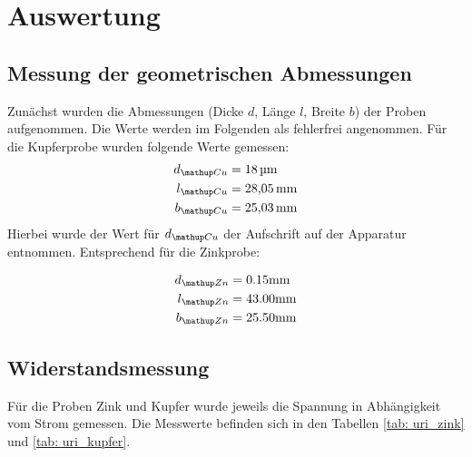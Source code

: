 \newpage

\section{Auswertung}

\subsection{Messung der geometrischen Abmessungen}
Zunächst wurden die Abmessungen (Dicke $d$, Länge $l$, Breite $b$) der Proben aufgenommen. Die Werte
werden im Folgenden als fehlerfrei angenommen. Für die Kupferprobe wurden folgende Werte gemessen:
\begin{align}
  \begin{aligned}
    d\ua{Cu} &= \SI{18}{\micro \meter} \\
    l\ua{Cu} &= \SI{28.05}{\milli \meter}\\
    b\ua{Cu} &= \SI{25.03}{\milli \meter}
        \label{eq: abmessungen_kupfer}
      \end{aligned}
\end{align}
Hierbei wurde der Wert für $d\ua{Cu}$ der Aufschrift auf der Apparatur entnommen.
Entsprechend für die Zinkprobe:

\begin{align}
  \begin{aligned}
    d\ua{Zn} &= 0.15 \si{\milli \meter} \\ %
    l\ua{Zn} &= 43.00 \si{\milli \meter}\\
    b\ua{Zn} &= 25.50 \si{\milli \meter}
        \label{eq: abmessungen_zink}
      \end{aligned}
\end{align}



\subsection{Widerstandsmessung}
Für die Proben Zink und Kupfer wurde jeweils die Spannung in Abhängigkeit vom Strom gemessen. Die Messwerte befinden sich
in den Tabellen \ref{tab: uri_zink} und \ref{tab: uri_kupfer}.


